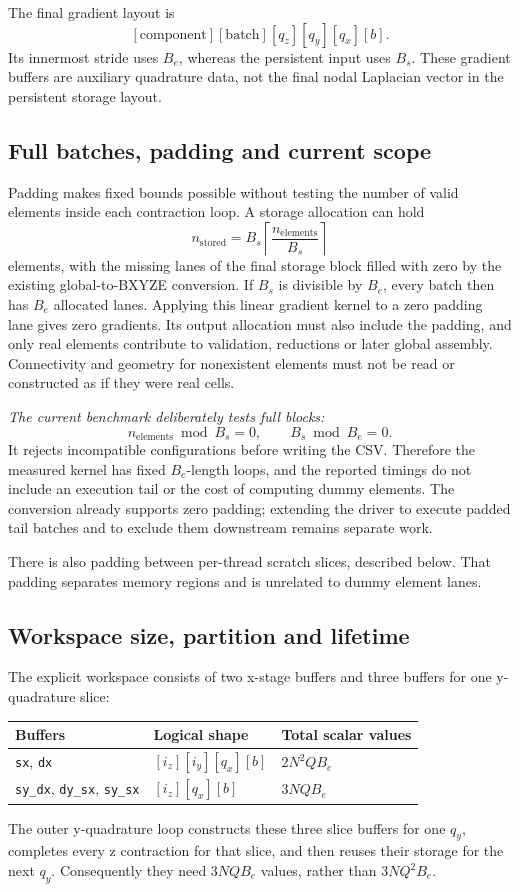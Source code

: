 \documentclass[11pt]{article}
\begin{document}
The final gradient layout is
\[
 [\text{component}][\text{batch}][q_z][q_y][q_x][b].
\]
Its innermost stride uses \(B_e\), whereas the persistent input uses \(B_s\).
These gradient buffers are auxiliary quadrature data, not the final nodal
Laplacian vector in the persistent storage layout.

\subsection{Full batches, padding and current scope}

Padding makes fixed bounds possible without testing the number of valid
elements inside each contraction loop. A storage allocation can hold
\[
 n_{\mathrm{stored}}=
 B_s\left\lceil\frac{n_{\mathrm{elements}}}{B_s}\right\rceil
\]
elements, with the missing lanes of the final storage block filled with zero
by the existing global-to-BXYZE conversion. If \(B_s\) is divisible by
\(B_e\), every batch then has \(B_e\) allocated lanes. Applying this linear
gradient kernel to a zero padding lane gives zero gradients. Its output
allocation must also include the padding, and only real elements contribute to
validation, reductions or later global assembly. Connectivity and geometry for
nonexistent elements must not be read or constructed as if they were real cells.

\emph{The current benchmark deliberately tests full blocks:}
\[
 n_{\mathrm{elements}}\bmod B_s=0,\qquad B_s\bmod B_e=0.
\]
It rejects incompatible configurations before writing the CSV. Therefore the
measured kernel has fixed \(B_e\)-length loops, and the reported timings do
not include an execution tail or the cost of computing dummy elements. The
conversion already supports zero padding; extending the driver to execute
padded tail batches and to exclude them downstream remains separate work.

There is also padding between per-thread scratch slices, described below.
That padding separates memory regions and is unrelated to dummy element lanes.

\subsection{Workspace size, partition and lifetime}

The explicit workspace consists of two x-stage buffers and three buffers for
one y-quadrature slice:
\begin{center}
\begin{tabular}{lll}
\toprule
Buffers & Logical shape & Total scalar values\\
\midrule
\texttt{sx}, \texttt{dx} & $[i_z][i_y][q_x][b]$ & $2N^2QB_e$\\
\texttt{sy\_dx}, \texttt{dy\_sx}, \texttt{sy\_sx}
 & $[i_z][q_x][b]$ & $3NQB_e$\\
\bottomrule
\end{tabular}
\end{center}
The outer y-quadrature loop constructs these three slice buffers for one
\(q_y\), completes every z contraction for that slice, and then reuses their
storage for the next \(q_y\). Consequently they need \(3NQB_e\) values,
rather than \(3NQ^2B_e\).
\end{document}
